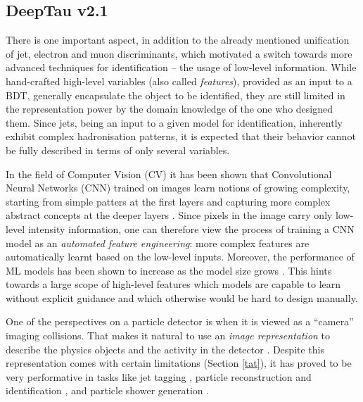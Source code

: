 \subsection{DeepTau v2.1} \label{deeptau1}
There is one important aspect, in addition to the already mentioned unification of jet, electron and muon discriminants, which motivated a switch towards more advanced techniques for \tauh identification -- the usage of low-level information. While hand-crafted high-level variables (also called \textit{features}), provided as an input to a BDT, generally encapsulate the object to be identified, they are still limited in the representation power by the domain knowledge of the one who designed them. Since jets, being an input to a given model for \tauh identification, inherently exhibit complex hadronisation patterns, it is expected that their behavior cannot be fully described in terms of only several variables.

In the field of Computer Vision (CV) it has been shown that Convolutional Neural Networks (CNN) trained on images learn notions of growing complexity, starting from simple patters at the first layers and capturing more complex abstract concepts at the deeper layers \cite{olah2017feature}. Since pixels in the image carry only low-level intensity information, one can therefore view the process of training a CNN model as an \textit{automated feature engineering}: more complex features are automatically learnt based on the low-level inputs. Moreover, the performance of ML models has been shown to increase as the model size grows \cite{726791,NIPS2012_c399862d,simonyan2014very,szegedy2015going,he2016deep,huang2017densely,tan2019efficientnet}. This hints towards a large scope of high-level features which models are capable to learn without explicit guidance and which otherwise would be hard to design manually.

One of the perspectives on a particle detector is when it is viewed as a \enquote{camera} imaging collisions. That makes it natural to use an \textit{image representation} to describe the physics objects and the activity in the detector \cite{Cogan:2014oua,deOliveira:2015xxd,Kagan:2020yrm}. Despite this representation comes with certain limitations (Section \ref{tat}), it has proved to be very performative in tasks like jet tagging \cite{Kasieczka:2019dbj,ATLAS:2017dfg,CMS:2020poo}, particle reconstruction and identification \cite{KM3NeT:2020zod,Collado:2020ehf,Collado:2020fwm,Abbasi:2021ryj}, and particle shower generation \cite{Paganini:2017dwg,Khattak:2021ndw,Buhmann:2021caf}.

